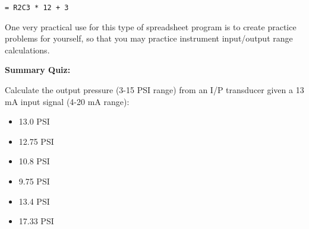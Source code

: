 \vskip 10pt

{\tt = R2C3 * 12 + 3}

\vskip 10pt

One very practical use for this type of spreadsheet program is to create practice problems for yourself, so that you may practice instrument input/output range calculations.







\vfil \eject

\noindent
{\bf Summary Quiz:}

Calculate the output pressure (3-15 PSI range) from an I/P transducer given a 13 mA input signal (4-20 mA range):

\begin{itemize}
\item{} 13.0 PSI
\vskip 5pt
\item{} 12.75 PSI
\vskip 5pt
\item{} 10.8 PSI
\vskip 5pt
\item{} 9.75 PSI
\vskip 5pt
\item{} 13.4 PSI
\vskip 5pt
\item{} 17.33 PSI
\end{itemize}




